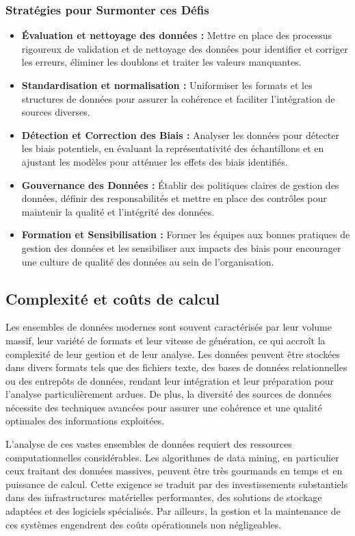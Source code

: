 \documentclass[a4paper,14pt]{article}
\begin{document}
		\subsubsection{Stratégies pour Surmonter ces Défis}
			\begin{itemize}
				\item \textbf{Évaluation et nettoyage des données :} Mettre en place des processus rigoureux de validation et de nettoyage des données pour identifier et corriger les erreurs, éliminer les doublons et traiter les valeurs manquantes. 
				\item \textbf{Standardisation et normalisation :} Uniformiser les formats et les structures de données pour assurer la cohérence et faciliter l'intégration de sources diverses. 
				\item \textbf{Détection et Correction des Biais :} Analyser les données pour détecter les biais potentiels, en évaluant la représentativité des échantillons et en ajustant les modèles pour atténuer les effets des biais identifiés. 
				\item \textbf{Gouvernance des Données :} Établir des politiques claires de gestion des données, définir des responsabilités et mettre en place des contrôles pour maintenir la qualité et l'intégrité des données. 
				\item \textbf{Formation et Sensibilisation :} Former les équipes aux bonnes pratiques de gestion des données et les sensibiliser aux impacts des biais pour encourager une culture de qualité des données au sein de l'organisation.
			\end{itemize}

	\subsection{Complexité et coûts de calcul}
		Les ensembles de données modernes sont souvent caractérisés par leur volume massif, leur variété de formats et leur vitesse de génération, ce qui accroît la complexité de leur gestion et de leur analyse. Les données peuvent être stockées dans divers formats tels que des fichiers texte, des bases de données relationnelles ou des entrepôts de données, rendant leur intégration et leur préparation pour l'analyse particulièrement ardues. De plus, la diversité des sources de données nécessite des techniques avancées pour assurer une cohérence et une qualité optimales des informations exploitées.

		L'analyse de ces vastes ensembles de données requiert des ressources computationnelles considérables. Les algorithmes de data mining, en particulier ceux traitant des données massives, peuvent être très gourmands en temps et en puissance de calcul. Cette exigence se traduit par des investissements substantiels dans des infrastructures matérielles performantes, des solutions de stockage adaptées et des logiciels spécialisés. Par ailleurs, la gestion et la maintenance de ces systèmes engendrent des coûts opérationnels non négligeables.
\end{document}
